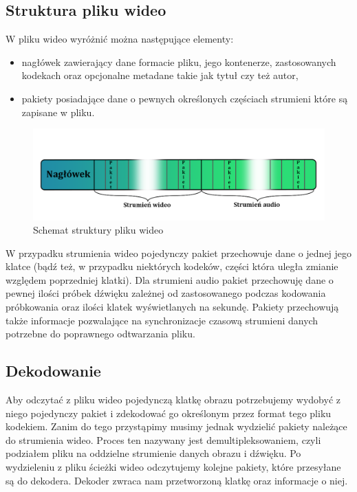 \documentclass[twoside]{projektInzynierskiMS}
\begin{document}
\subsection{Struktura pliku wideo}
W pliku wideo wyróżnić można następujące elementy: 
\begin{itemize}
	\item nagłówek zawierający dane formacie pliku, jego kontenerze, zastosowanych kodekach oraz opcjonalne metadane takie jak tytuł czy też autor,
	\item pakiety posiadające dane o pewnych określonych częściach strumieni które są zapisane w pliku.
\end{itemize}
\begin{figure}[h]
	\centering
	\includegraphics[width=13cm]{file_struct.png}
	\caption{Schemat struktury pliku wideo}
\end{figure}

W przypadku strumienia wideo pojedynczy pakiet przechowuje dane o jednej jego klatce (bądź też, w przypadku niektórych kodeków, części która uległa zmianie względem poprzedniej klatki). Dla strumieni audio pakiet przechowuję dane o pewnej ilości próbek dźwięku zależnej od zastosowanego podczas kodowania próbkowania oraz ilości klatek wyświetlanych na sekundę. Pakiety przechowują także informacje pozwalające na synchronizacje czasową strumieni danych potrzebne do poprawnego odtwarzania pliku.

\subsection{Dekodowanie}
Aby odczytać z pliku wideo pojedynczą klatkę obrazu potrzebujemy wydobyć z niego pojedynczy pakiet i zdekodować go określonym przez format tego pliku kodekiem. Zanim do tego przystąpimy musimy jednak wydzielić pakiety należące do strumienia wideo. Proces ten nazywany jest demultipleksowaniem, czyli podziałem pliku na oddzielne strumienie danych obrazu i dźwięku. Po wydzieleniu z pliku ścieżki wideo odczytujemy kolejne pakiety, które przesyłane są do dekodera. Dekoder zwraca nam przetworzoną klatkę oraz informacje o niej. 
\end{document}
